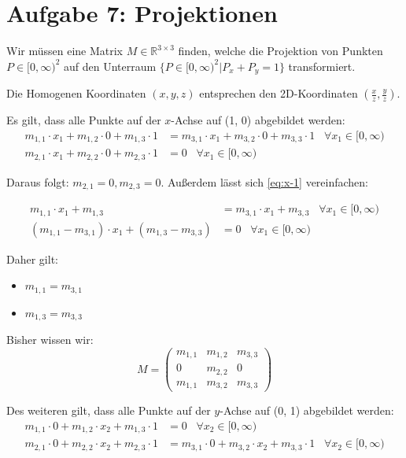 \documentclass[a4paper]{scrartcl}
\begin{document}
\clearpage
\section*{Aufgabe 7: Projektionen}
Wir müssen eine Matrix $M \in \mathbb{R}^{3 \times 3}$ finden, welche die
Projektion von Punkten $P \in [0, \infty)^2$ auf den Unterraum
$\{P \in [0, \infty)^2 | P_x + P_y = 1\}$ transformiert.

Die Homogenen Koordinaten $(x, y, z)$ entsprechen den 2D-Koordinaten
$(\frac{x}{z}, \frac{y}{z})$.

\goodbreak
Es gilt, dass alle Punkte auf der $x$-Achse auf (1, 0) abgebildet werden:\nobreak
\begin{align}
    m_{1,1} \cdot x_1 + m_{1,2} \cdot 0 + m_{1,3} \cdot 1 &= m_{3,1} \cdot x_1 + m_{3,2} \cdot 0 + m_{3,3} \cdot 1 \;\;\; \forall x_1 \in [0, \infty) \label{eq:x-1}\\
    m_{2,1} \cdot x_1 + m_{2,2} \cdot 0 + m_{2,3} \cdot 1 &= 0 \;\;\; \forall x_1 \in [0, \infty)
\end{align}

Daraus folgt: $m_{2,1} = 0, m_{2,3} = 0$. Außerdem lässt sich \cref{eq:x-1}
vereinfachen:

\begin{align}
    m_{1,1} \cdot x_1 +  m_{1,3} &= m_{3,1} \cdot x_1 + m_{3,3} \;\;\; \forall x_1 \in [0, \infty)\\
    (m_{1,1} - m_{3,1}) \cdot x_1 + (m_{1,3} - m_{3,3}) &= 0 \;\;\; \forall x_1 \in [0, \infty)\label{eq:x-1.1}
\end{align}

Daher gilt:

\begin{itemize}
    \item $m_{1,1} = m_{3,1}$
    \item $m_{1,3} = m_{3,3}$
\end{itemize}

Bisher wissen wir:\nobreak
\[M = \begin{pmatrix}            m_{1,1} & m_{1,2} & m_{3,3}\\
                                       0 & m_{2,2} & 0\\
                                 m_{1,1} & m_{3,2} & m_{3,3}\end{pmatrix}\]

\goodbreak
Des weiteren gilt, dass alle Punkte auf der $y$-Achse auf (0, 1) abgebildet werden:\nobreak
\begin{align}
    m_{1,1} \cdot 0 + m_{1,2} \cdot x_2 + m_{1,3} \cdot 1 &= 0 \;\;\; \forall x_2 \in [0, \infty)\\
    m_{2,1} \cdot 0 + m_{2,2} \cdot x_2 + m_{2,3} \cdot 1 &= m_{3,1} \cdot 0 + m_{3,2} \cdot x_2 + m_{3,3} \cdot 1 \;\;\; \forall x_2 \in [0, \infty)
\end{align}
\end{document}
